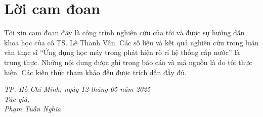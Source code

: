 \chapter*{Lời cam đoan}
Tôi xin cam đoan đây là công trình nghiên cứu của tôi và được sự hướng dẫn khoa học của cô TS. Lê Thanh Vân. Các số liệu và kết quả nghiên cứu trong luận văn thạc sĩ ``Ứng dụng học máy trong phát hiện rò rỉ hệ thống cấp nước'' là trung thực. Những nội dung được ghi trong báo cáo và mã nguồn là do tôi thực hiện. Các kiến thức tham khảo đều được trích dẫn đầy đủ.
\begin{flushright}
\textit{
TP. Hồ Chí Minh, ngày 12 tháng 05 năm 2025\\
Tác giả,\\
Phạm Tuấn Nghĩa
}
\end{flushright}